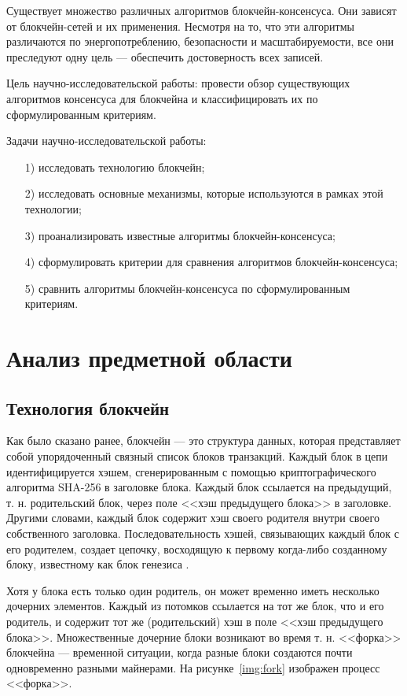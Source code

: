 Существует множество различных алгоритмов блокчейн-консенсуса. 
Они зависят от блокчейн-сетей и их применения. 
Несмотря на то, что эти алгоритмы различаются по энергопотреблению, безопасности и масштабируемости, все они преследуют одну цель --- обеспечить достоверность всех записей.

Цель научно-исследовательской работы: провести обзор существующих алгоритмов консенсуса для блокчейна и классифицировать их по сформулированным критериям.

Задачи научно-исследовательской работы:

\begin{enumerate}
\item[1)]
исследовать технологию блокчейн;
\item[2)]
исследовать основные механизмы, которые используются в рамках этой технологии;
\item[3)]
проанализировать известные алгоритмы блокчейн-консенсуса;
\item[4)]
сформулировать критерии для сравнения алгоритмов блокчейн-консенсуса;
\item[5)]
сравнить алгоритмы блокчейн-консенсуса по сформулированным критериям.
\end{enumerate}

\chapter{Анализ предметной области}

\section{Технология блокчейн}

Как было сказано ранее, блокчейн --- это структура данных, которая представляет собой упорядоченный связный список блоков транзакций. 
Каждый блок в цепи идентифицируется хэшем, сгенерированным с помощью криптографического алгоритма SHA-256 в заголовке блока. 
Каждый блок ссылается на предыдущий, т. н. родительский блок, через поле <<хэш предыдущего блока>> в заголовке. 
Другими словами, каждый блок содержит хэш своего родителя внутри своего собственного заголовка. 
Последовательность хэшей, связывающих каждый блок с его родителем, создает цепочку, восходящую к первому когда-либо созданному блоку, известному как блок генезиса \cite[163]{Antonopoulos2010}.

Хотя у блока есть только один родитель, он может временно иметь несколько дочерних элементов. 
Каждый из потомков ссылается на тот же блок, что и его родитель, и содержит тот же (родительский) хэш в поле <<хэш предыдущего блока>>. 
Множественные дочерние блоки возникают во время т. н. <<форка>> блокчейна --- временной ситуации, когда разные блоки создаются почти одновременно разными майнерами. 
На рисунке~\ref{img:fork} изображен процесс <<форка>>.


